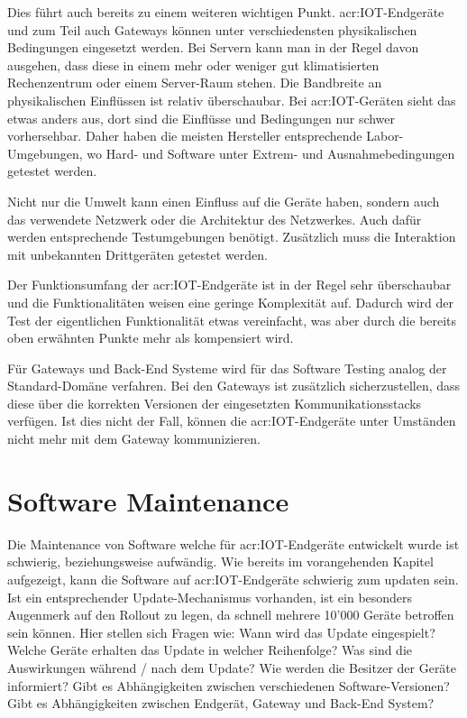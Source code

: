 Dies führt auch bereits zu einem weiteren wichtigen Punkt. \gls{acr:IOT}-Endgeräte und zum Teil auch Gateways können unter verschiedensten physikalischen Bedingungen eingesetzt werden. Bei Servern kann man in der Regel davon ausgehen, dass diese in einem mehr oder weniger gut klimatisierten Rechenzentrum oder einem Server-Raum stehen. Die Bandbreite an physikalischen Einflüssen ist relativ überschaubar. Bei \gls{acr:IOT}-Geräten sieht das etwas anders aus, dort sind die Einflüsse und Bedingungen nur schwer vorhersehbar. Daher haben die meisten Hersteller entsprechende Labor-Umgebungen, wo Hard- und Software unter Extrem- und Ausnahmebedingungen getestet werden.

Nicht nur die Umwelt kann einen Einfluss auf die Geräte haben, sondern auch das verwendete Netzwerk oder die Architektur des Netzwerkes. Auch dafür werden entsprechende Testumgebungen benötigt. Zusätzlich muss die Interaktion mit unbekannten Drittgeräten getestet werden.

Der Funktionsumfang der \gls{acr:IOT}-Endgeräte ist in der Regel sehr überschaubar und die Funktionalitäten weisen eine geringe Komplexität auf. Dadurch wird der Test der eigentlichen Funktionalität etwas vereinfacht, was aber durch die bereits oben erwähnten Punkte mehr als kompensiert wird.


Für Gateways und Back-End Systeme wird für das Software Testing analog der Standard-Domäne verfahren. Bei den Gateways ist zusätzlich sicherzustellen, dass diese über die korrekten Versionen der eingesetzten Kommunikationsstacks verfügen. Ist dies nicht der Fall, können die \gls{acr:IOT}-Endgeräte unter Umständen nicht mehr mit dem Gateway kommunizieren.


\section{Software Maintenance}
Die Maintenance von Software welche für \gls{acr:IOT}-Endgeräte entwickelt wurde ist schwierig, beziehungsweise aufwändig. Wie bereits im vorangehenden Kapitel aufgezeigt, kann die Software auf \gls{acr:IOT}-Endgeräte schwierig zum updaten sein. Ist ein entsprechender Update-Mechanismus vorhanden, ist ein besonders Augenmerk auf den Rollout zu legen, da schnell mehrere 10'000 Geräte betroffen sein können. Hier stellen sich Fragen wie: Wann wird das Update eingespielt? Welche Geräte erhalten das Update in welcher Reihenfolge? Was sind die Auswirkungen während / nach dem Update? Wie werden die Besitzer der Geräte informiert? Gibt es Abhängigkeiten zwischen verschiedenen Software-Versionen? Gibt es Abhängigkeiten zwischen Endgerät, Gateway und Back-End System?

